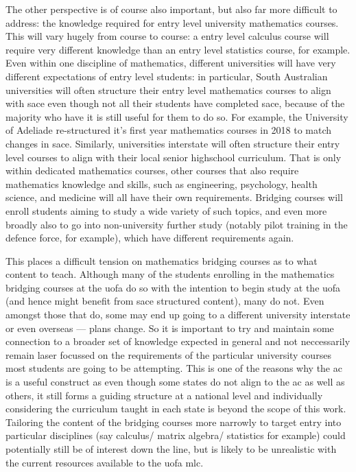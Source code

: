\documentclass[twoside,12pt,a4paper]{report}
\begin{document}
The other perspective is of course also important, but also far more difficult to address: the knowledge required for entry level university mathematics courses. This will vary hugely from course to course: a entry level calculus course will require very different knowledge than an entry level statistics course, for example. Even within one discipline of mathematics, different universities will have very different expectations of entry level students: in particular, South Australian universities will often structure their entry level mathematics courses to align with \gls{sace} even though not all their students have completed \gls{sace}, because of the majority who have it is still useful for them to do so. For example, the University of Adeliade re-structured it's first year mathematics courses in 2018 to match changes in \gls{sace}. Similarly, universities interstate will often structure their entry level courses to align with their local senior highschool curriculum. That is only within dedicated mathematics courses, other courses that also require mathematics knowledge and skills, such as engineering, psychology, health science, and medicine will all have their own requirements. Bridging courses will enroll students aiming to study a wide variety of such topics, and even more broadly also to go into non-university further study (notably pilot training in the defence force, for example), which have different requirements again.

This places a difficult tension on mathematics bridging courses as to what content to teach. Although many of the students enrolling in the mathematics bridging courses at the \gls{uofa} do so with the intention to begin study at the \gls{uofa} (and hence might benefit from \gls{sace} structured content), many do not. Even amongst those that do, some may end up going to a different university interstate or even overseas --- plans change. So it is important to try and maintain some connection to a broader set of knowledge expected in general and not neccessarily remain laser focussed on the requirements of the particular university courses most students are going to be attempting. This is one of the reasons why the \gls{ac} is a useful construct as even though some states do not align to the \gls{ac} as well as others, it still forms a guiding structure at a national level and individually considering the curriculum taught in each state is beyond the scope of this work. Tailoring the content of the bridging courses more narrowly to target entry into particular disciplines (say calculus/ matrix algebra/ statistics for example) could potentially still be of interest down the line, but is likely to be unrealistic with the current resources available to the \gls{uofa} \gls{mlc}.
\end{document}
